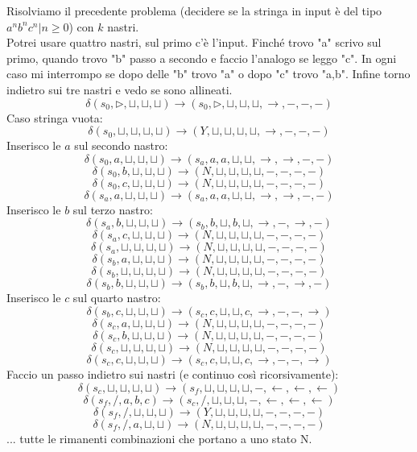 \begin{esempio}
  Risolviamo il precedente problema (decidere se la stringa in input è del tipo
  $a^nb^nc^n | n\geq0$) con $k$ nastri.\\
  Potrei usare quattro nastri, sul primo c'è l'input. Finché trovo "a" scrivo sul
  primo, quando trovo "b" passo a secondo e faccio l'analogo se leggo "c". In
  ogni caso mi interrompo se dopo delle "b" trovo "a" o dopo "c" trovo
  "a,b". Infine torno indietro sui tre nastri e vedo se sono allineati.
    \[\delta(s_0,\triangleright, \sqcup, \sqcup, \sqcup)\to (s_0, \triangleright , \sqcup, \sqcup, \sqcup, \rightarrow, -, - ,-)\]
    Caso stringa vuota:
    \[\delta(s_0,\sqcup, \sqcup, \sqcup, \sqcup)\to (Y, \sqcup , \sqcup, \sqcup, \sqcup, \rightarrow, -, -, -)\]
    Inserisco le $a$ sul secondo nastro:
    \[\delta(s_0, a, \sqcup, \sqcup, \sqcup)\to (s_a, a , a, \sqcup, \sqcup, \rightarrow, \rightarrow, -, -)\]
    \[\delta(s_0, b, \sqcup, \sqcup, \sqcup)\to (N, \sqcup, \sqcup, \sqcup, \sqcup, -, -, -, -)\]
    \[\delta(s_0, c, \sqcup, \sqcup, \sqcup)\to (N, \sqcup, \sqcup, \sqcup, \sqcup, -, -, -, -)\]
    \[\delta(s_a, a, \sqcup, \sqcup, \sqcup)\to (s_a, a, a, \sqcup, \sqcup, \rightarrow, \rightarrow, -, -)\]
    Inserisco le $b$ sul terzo nastro:
    \[\delta(s_a, b, \sqcup, \sqcup, \sqcup)\to (s_b, b, \sqcup, b, \sqcup, \rightarrow,  -, \rightarrow, -)\]
    \[\delta(s_a, c, \sqcup, \sqcup, \sqcup)\to (N, \sqcup, \sqcup, \sqcup, \sqcup, -, -, -, -)\]
    \[\delta(s_a, \sqcup, \sqcup, \sqcup, \sqcup)\to (N, \sqcup, \sqcup, \sqcup, \sqcup, -, -, -, -)\]
    \[\delta(s_b, a, \sqcup, \sqcup, \sqcup)\to (N, \sqcup, \sqcup, \sqcup, \sqcup, -, -, -, -)\]
    \[\delta(s_b, \sqcup, \sqcup, \sqcup, \sqcup)\to (N, \sqcup, \sqcup, \sqcup, \sqcup, -, -, -, -)\]
    \[\delta(s_b, b, \sqcup, \sqcup, \sqcup)\to (s_b, b, \sqcup, b, \sqcup, \rightarrow, -, \rightarrow, -)\]
    Inserisco le $c$ sul quarto nastro:
    \[\delta(s_b, c, \sqcup, \sqcup, \sqcup)\to (s_c, c, \sqcup, \sqcup, c, \rightarrow, -, -, \rightarrow)\]
    \[\delta(s_c, a, \sqcup, \sqcup, \sqcup)\to (N, \sqcup, \sqcup, \sqcup, \sqcup, -, -, -, -)\]
    \[\delta(s_c, b, \sqcup, \sqcup, \sqcup)\to (N, \sqcup, \sqcup, \sqcup, \sqcup, -, -, -, -)\]
    \[\delta(s_c, \sqcup, \sqcup, \sqcup, \sqcup)\to (N, \sqcup, \sqcup, \sqcup, \sqcup, -, -, -, -)\]
    \[\delta(s_c, c, \sqcup, \sqcup, \sqcup)\to (s_c, c, \sqcup, \sqcup, c, \rightarrow, -, -, \rightarrow)\]
    Faccio un passo indietro sui nastri (e continuo così ricorsivamente):
    \[\delta(s_c, \sqcup, \sqcup, \sqcup, \sqcup)\to (s_f, \sqcup, \sqcup, \sqcup, \sqcup, -, \leftarrow, \leftarrow, \leftarrow)\]
    \[\delta(s_f, /, a, b, c)\to (s_c, /, \sqcup, \sqcup, \sqcup, -, \leftarrow, \leftarrow, \leftarrow)\]
    \[\delta(s_f, /, \sqcup, \sqcup, \sqcup)\to (Y, \sqcup, \sqcup, \sqcup, \sqcup, -, -, -, -)\]
    \[\delta(s_f, /, a, \sqcup, \sqcup)\to (N, \sqcup, \sqcup, \sqcup, \sqcup, -, -, -, -)\]
    ... tutte le rimanenti combinazioni che portano a uno stato N.
\end{esempio}
